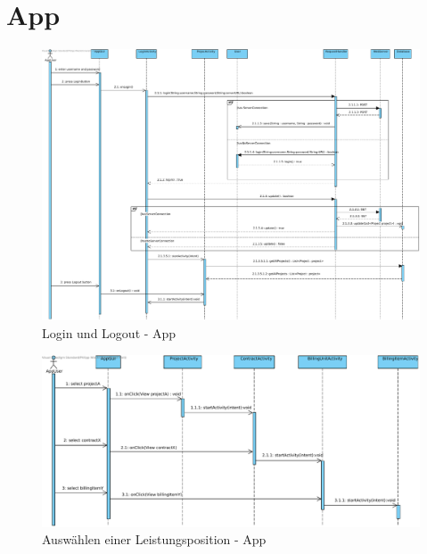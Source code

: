 \section{App}
\begin{figure}[H]
	\centering
	\includegraphics[width=\linewidth]{img/diagrams/App login, pull data, logout.pdf}		
	\caption{Login und Logout - App}
	\label{fig:sequenzdiagramm-app}
\end{figure}

\begin{figure}[H]
\centering
\includegraphics[width=\linewidth]{img/diagrams/Select BillingItem.pdf}		
\caption{Auswählen einer Leistungsposition - App}
\label{fig:sequenzdiagramm-app}
\end{figure}

